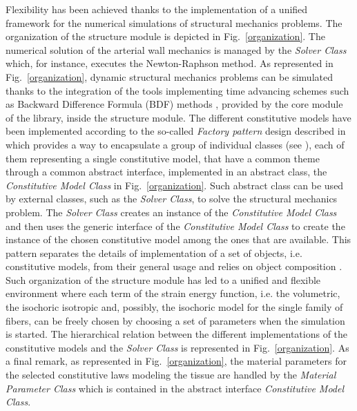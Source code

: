 \documentclass[a4paper, 10pt,twoside]{article}
\theoremstyle{plain}
\theoremstyle{definition}
\theoremstyle{remark}
\newcommand{\figRef}[1]{Fig.~\ref{#1}}
\begin{document}
Flexibility has been achieved thanks to the implementation of a unified framework for the numerical simulations of structural mechanics problems. The organization of the structure module is depicted in \figRef{organization}. The numerical solution of the arterial wall mechanics is managed by the \textit{Solver Class} which, for instance, executes the Newton-Raphson method. As represented in \figRef{organization}, dynamic structural mechanics problems can be simulated thanks to the integration of the tools implementing time advancing schemes such as Backward Difference Formula (BDF) methods \cite{book::QSS00}, provided by the core module of the library, inside the structure module.  The different constitutive models have been implemented according to the so-called \textit{Factory pattern} design described in \cite{book::DesignPattern} which provides a way to encapsulate a group of individual classes (see \cite{book::Cplus}), each of them representing a single constitutive model, that have a common theme through a common abstract interface, implemented in an abstract class, the \textit{Constitutive Model Class} in \figRef{organization}. Such abstract class can be used by external classes, such as the \textit{Solver Class}, to solve the structural mechanics problem. The \textit{Solver Class} creates an instance of the \textit{Constitutive Model Class} \cite{book::Cplus} and then uses the generic interface of the \textit{Constitutive Model Class} to create the instance of the chosen constitutive model among the ones that are available. This pattern separates the details of implementation of a set of objects, i.e. constitutive models, from their general usage and relies on object composition \cite{book::DesignPattern}. Such organization of the structure module has led to a unified and flexible environment where each term of the strain energy function, i.e. the volumetric, the isochoric isotropic and, possibly, the isochoric model for the single family of fibers, can be freely chosen by choosing a set of parameters when the simulation is started. The hierarchical relation between the different implementations of the constitutive models and the \textit{Solver Class} is represented in \figRef{organization}. As a final remark, as represented in \figRef{organization}, the material parameters for the selected constitutive laws modeling the tissue are handled by the \textit{Material Parameter Class} which is contained in the abstract interface \textit{Constitutive Model Class}.
\end{document}
